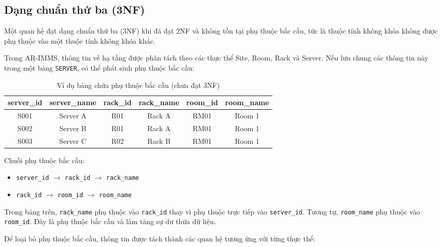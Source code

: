 \subsection{Dạng chuẩn thứ ba (3NF)}
Một quan hệ đạt dạng chuẩn thứ ba (3NF) khi đã đạt 2NF và không tồn tại phụ thuộc bắc cầu, tức là thuộc tính không khóa không được phụ thuộc vào một thuộc tính không khóa khác.

Trong AR-IMMS, thông tin về hạ tầng được phân tách theo các thực thể Site, Room, Rack và Server. Nếu lưu chung các thông tin này trong một bảng \texttt{SERVER}, có thể phát sinh phụ thuộc bắc cầu:

\begin{table}[H]
\centering
\caption{Ví dụ bảng chứa phụ thuộc bắc cầu (chưa đạt 3NF)}
\begin{tabular}{|c|c|c|c|c|c|}
\hline
\textbf{server\_id} & \textbf{server\_name} & \textbf{rack\_id} & \textbf{rack\_name} & \textbf{room\_id} & \textbf{room\_name} \\ \hline
S001 & Server A & R01 & Rack A & RM01 & Room 1 \\ \hline
S002 & Server B & R01 & Rack A & RM01 & Room 1 \\ \hline
S003 & Server C & R02 & Rack B & RM01 & Room 1 \\ \hline
\end{tabular}
\end{table}

Chuỗi phụ thuộc bắc cầu:
\begin{itemize}
    \item \texttt{server\_id} $\rightarrow$ \texttt{rack\_id} $\rightarrow$ \texttt{rack\_name}
    \item \texttt{rack\_id} $\rightarrow$ \texttt{room\_id} $\rightarrow$ \texttt{room\_name}
\end{itemize}

Trong bảng trên, \texttt{rack\_name} phụ thuộc vào \texttt{rack\_id} thay vì phụ thuộc trực tiếp vào \texttt{server\_id}. Tương tự, \texttt{room\_name} phụ thuộc vào \texttt{room\_id}. Đây là phụ thuộc bắc cầu và làm tăng sự dư thừa dữ liệu.

Để loại bỏ phụ thuộc bắc cầu, thông tin được tách thành các quan hệ tương ứng với từng thực thể:

